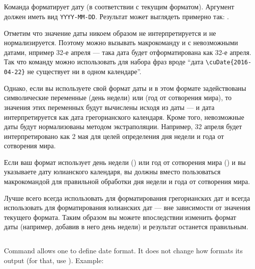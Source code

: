 \begin{RU}

\subsection{}
Команда форматирует дату (в соответствии с текущим форматом). Аргумент должен иметь вид \texttt{YYYY-MM-DD}. Результат
может выглядеть примерно так: .

Отметим что значение даты никоем образом не интерпретируется и не нормализируется. Поэтому можно вызывать макрокоманду и с
невозможными датами, нпример 32-е апреля --- така дата будет отформатирована как 32-е апреля. Так что команду  можно
использовать для набора фраз вроде ``дата \verb+\cuDate{2016-04-22}+ не существует ни в одном календаре''.

Однако, если вы используете свой формат даты и в этом формате задействованы символические переменные  (день недели) 
или  (год от сотворения мира), то значения этих переменных будут вычислены исходя из даты --- и дата интерпретируется
как дата грегорианского календаря. Кроме того, невозможные даты будут нормализованы методом экстраполяции. Например, 32 апреля
будет интерпретировано как 2 мая для целей определения дня недели и года от сотворения мира.

Если ваш формат использует день недели () или год от сотворения мира () и вы указываете дату юлианского календаря,
вы должны вместо  пользоваться макрокомандой  для правильной обработки дня недели и года от сотворения мира.

Лучше всего всегда использовать  для форматирования грегорианских дат и всегда использовать  для
форматирования юлианских дат --- вне зависимости от значения текущего формата. Таким образом вы можете впоследствии изменить
формат даты (например, добавив в него день недели) и результат останется правильным.
\end{RU}

\begin{EN}
\subsection{}
Command allows one to define date format. It does not change how  formats its output (for that, use ).
Example:
\end{EN}

